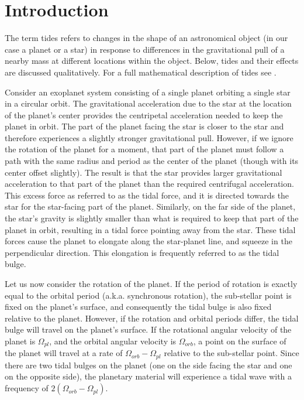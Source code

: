 \section{Introduction}
%
\label{sec:introduction}

The term tides refers to changes in the shape of an astronomical object (in our
case a planet or a star) in response to differences in the gravitational pull of
a nearby mass at different locations within the object. Below, tides and their
effects are discussed qualitatively. For a full mathematical description of
tides see \cite{Murray_Dermott_book}.

Consider an exoplanet system consisting of a single planet orbiting a single
star in a circular orbit. The gravitational acceleration due to the star at the
location of the planet's center provides the centripetal acceleration needed to
keep the planet in orbit. The part of the planet facing the star is closer to
the star and therefore experiences a slightly stronger gravitational pull.
However, if we ignore the rotation of the planet for a moment, that part of the
planet must follow a path with the same radius and period as the center of the
planet (though with its center offset slightly). The result is that the star
provides larger gravitational acceleration to that part of the planet than the
required centrifugal acceleration. This excess force as referred to as the tidal
force, and it is directed towards the star for the star-facing part of the
planet. Similarly, on the far side of the planet, the star's gravity is slightly
smaller than what is required to keep that part of the planet in orbit,
resulting in a tidal force pointing away from the star. These tidal forces cause
the planet to elongate along the star-planet line, and squeeze in the
perpendicular direction. This elongation is frequently referred to as the tidal
bulge.

Let us now consider the rotation of the planet. If the period of rotation is
exactly equal to the orbital period (a.k.a. synchronous rotation), the
sub-stellar point is fixed on the planet's surface, and consequently the tidal
bulge is also fixed relative to the planet. However, if the rotation and orbital
periods differ, the tidal bulge will travel on the planet's surface. If the
rotational angular velocity of the planet is $\Omega_{pl}$, and the orbital
angular velocity is $\Omega_{orb}$, a point on the surface of the planet will
travel at a rate of $\Omega_{orb} - \Omega_{pl}$ relative to the sub-stellar
point. Since there are two tidal bulges on the planet (one on the side facing
the star and one on the opposite side), the planetary material will experience a
tidal wave with a frequency of $2(\Omega_{orb} - \Omega_{pl})$.

